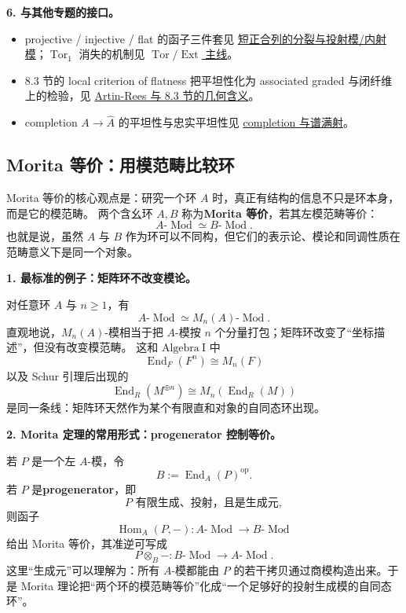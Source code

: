 \documentclass[a4paper]{ctexart}
\theoremstyle{definition}
\theoremstyle{analysis}
\theoremstyle{plain}
\begin{document}
\medskip

\textbf{6. 与其他专题的接口。}
\begin{itemize}
  \item projective / injective / flat 的函子三件套见 \hyperref[subsec:split-projective-injective]{短正合列的分裂与投射模/内射模}；\(\operatorname{Tor}_1\) 消失的机制见 \hyperref[subsec:topic-derived-functors]{\(\operatorname{Tor}/\operatorname{Ext}\) 主线}。
  \item 8.3 节的 local criterion of flatness 把平坦性化为 associated graded 与闭纤维上的检验，见 \hyperref[rem:local-flatness-geometry]{Artin-Rees 与 8.3 节的几何含义}。
  \item completion \(A\to\widehat A\) 的平坦性与忠实平坦性见 \hyperref[rem:completion-spec-not-surjective]{completion 与谱满射}。
\end{itemize}
\subsection{Morita 等价：用模范畴比较环}\label{subsec:topic-morita-equivalence}

Morita 等价的核心观点是：研究一个环 \(A\) 时，真正有结构的信息不只是环本身，而是它的模范畴。
两个含幺环 \(A,B\) 称为\textbf{Morita 等价}，若其左模范畴等价：
\[
  A\text{-}\operatorname{Mod}\simeq B\text{-}\operatorname{Mod}.
\]
也就是说，虽然 \(A\) 与 \(B\) 作为环可以不同构，但它们的表示论、模论和同调性质在范畴意义下是同一个对象。

\medskip

\textbf{1. 最标准的例子：矩阵环不改变模论。}

对任意环 \(A\) 与 \(n\ge 1\)，有
\[
  A\text{-}\operatorname{Mod}\simeq M_n(A)\text{-}\operatorname{Mod}.
\]
直观地说，\(M_n(A)\)-模相当于把 \(A\)-模按 \(n\) 个分量打包；矩阵环改变了“坐标描述”，但没有改变模范畴。
这和 \(\mathrm{Algebra\ I}\) 中
\[
  \operatorname{End}_F(F^n)\cong M_n(F)
\]
以及 Schur 引理后出现的
\[
  \operatorname{End}_R(M^{\oplus n})\cong M_n(\operatorname{End}_R(M))
\]
是同一条线：矩阵环天然作为某个有限直和对象的自同态环出现。

\medskip

\textbf{2. Morita 定理的常用形式：progenerator 控制等价。}

若 \(P\) 是一个左 \(A\)-模，令
\[
  B:=\operatorname{End}_A(P)^{\operatorname{op}}.
\]
若 \(P\) 是\textbf{progenerator}，即
\[
  P\text{ 有限生成、投射，且是生成元},
\]
则函子
\[
  \operatorname{Hom}_A(P,-):A\text{-}\operatorname{Mod}\longrightarrow B\text{-}\operatorname{Mod}
\]
给出 Morita 等价，其准逆可写成
\[
  P\otimes_B -:B\text{-}\operatorname{Mod}\longrightarrow A\text{-}\operatorname{Mod}.
\]
这里“生成元”可以理解为：所有 \(A\)-模都能由 \(P\) 的若干拷贝通过商模构造出来。于是 Morita 理论把“两个环的模范畴等价”化成“一个足够好的投射生成模的自同态环”。
\end{document}
